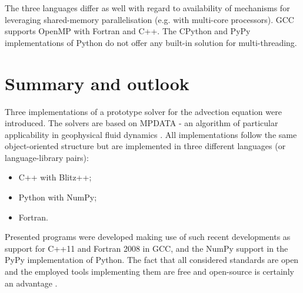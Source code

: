 \documentclass[twocolumn]{article}
\begin{document}
  The three languages differ as well with regard to availability of 
    mechanisms for leveraging shared-memory parallelisation (e.g. with multi-core processors).
  GCC supports OpenMP with Fortran and C++.
  The CPython and PyPy implementations of Python do not offer any
    built-in solution for multi-threading. 
  
  \section{Summary and outlook}\label{sec:concl}

  Three implementations of a prototype solver 
    for the advection equation were introduced.
  The solvers are based on MPDATA - an algorithm of particular applicability
    in geophysical fluid dynamics \citep{Smolarkiewicz_2006}.
  All implementations follow the same object-oriented structure but are implemented
    in three different languages (or language-library pairs):
  \begin{itemize}
    \item{C++ with Blitz++;}
    \item{Python with NumPy;}
    \item{Fortran.}
  \end{itemize}

  Presented programs were developed making use of such recent
    developments as support for C++11 and Fortran 2008 in GCC, and
    the NumPy support in the PyPy implementation of Python.
  The fact that all considered standards are open and the employed
    tools implementing them are free and open-source
    is certainly an advantage \citep[][sect.~28.2.5]{Anel_2011,Syvitski_et_al_2013}.
\end{document}
